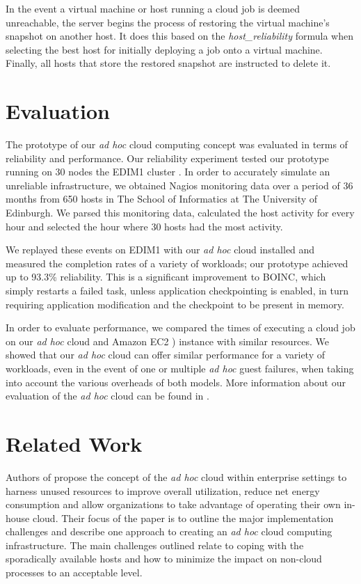 \documentclass[10pt, conference, compsocconf]{IEEEtran}
\begin{document}
In the event a virtual machine or host running a cloud job is deemed unreachable, the server begins the process of restoring the virtual machine's snapshot on another host. It does this based on the \textit{host\_reliability} formula when selecting the best host for initially deploying a job onto a virtual machine. Finally, all hosts that store the restored snapshot are instructed to delete it.

\section{Evaluation}
The prototype of our \textit{ad hoc} cloud computing concept was evaluated in terms of reliability and performance. Our reliability experiment tested our prototype running on 30 nodes the EDIM1 cluster \cite{Martin2011}. In order to accurately simulate an unreliable infrastructure, we obtained Nagios monitoring data over a period of 36 months from 650 hosts in The School of Informatics at The University of Edinburgh. We parsed this monitoring data, calculated the host activity for every hour and selected the hour where 30 hosts had the most activity.

We replayed these events on EDIM1 with our \textit{ad hoc} cloud installed and measured the completion rates of a variety of workloads; our prototype achieved up to 93.3\% reliability. This is a significant improvement to BOINC, which simply restarts a failed task, unless application checkpointing is enabled, in turn requiring application modification and the checkpoint to be present in memory.

In order to evaluate performance, we compared the times of executing a cloud job on our \textit{ad hoc} cloud and Amazon EC2 \cite{amazon_ec2}) instance with similar resources. We showed that our \textit{ad hoc} cloud can offer similar performance for a variety of workloads, even in the event of one or multiple \textit{ad hoc} guest failures, when taking into account the various overheads of both models. More information about our evaluation of the \textit{ad hoc} cloud can be found in \cite{McGilvary2014}.

\section{Related Work}
Authors of \cite{Kirby2010} propose the concept of the \textit{ad hoc} cloud within enterprise settings to harness unused resources to improve overall utilization, reduce net energy consumption and allow organizations to take advantage of operating their own in-house cloud. Their focus of the paper is to outline the major implementation challenges and describe one approach to creating an \textit{ad hoc} cloud computing infrastructure. The main challenges outlined relate to coping with the sporadically available hosts and how to minimize the impact on non-cloud processes to an acceptable level. 
\end{document}
